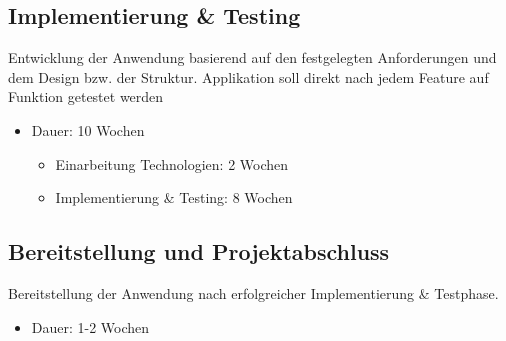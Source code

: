\documentclass[a4paper,12pt]{article}
\begin{document}

\subsection{Implementierung \& Testing}
Entwicklung der Anwendung basierend auf den festgelegten Anforderungen und dem Design bzw. der Struktur. Applikation soll direkt nach jedem Feature auf Funktion getestet werden
\begin{itemize}
    \item Dauer: 10 Wochen
    \begin{itemize}
        \item Einarbeitung Technologien: 2 Wochen
        \item Implementierung \& Testing: 8 Wochen
    \end{itemize}
\end{itemize}


\subsection{Bereitstellung und Projektabschluss}
Bereitstellung der Anwendung nach erfolgreicher Implementierung \& Testphase.
\begin{itemize}
    \item Dauer: 1-2 Wochen
\end{itemize}

\newpage

\end{document}

